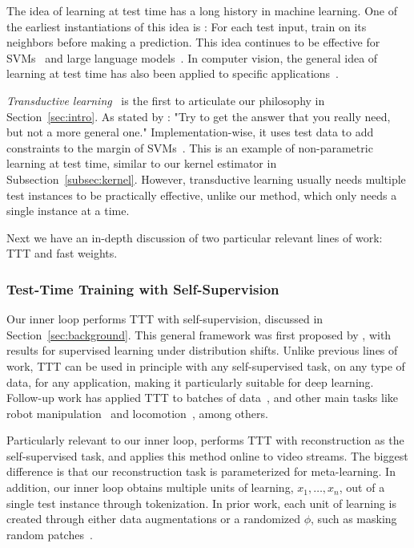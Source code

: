 \documentclass{article}
\begin{document}
The idea of learning at test time has a long history in machine learning.
One of the earliest instantiations of this idea is \cite{bottou1992local}:
For each test input, train on its neighbors before making a prediction.
This idea continues to be effective for SVMs~\citep{zhang2006svm} and large language models~\citep{hardt2023test}.
In computer vision, the general idea of learning at test time has also been applied to specific applications~\citep{jain2011online, shocher2018zero, mullapudi2018online, luo2020consistent, nitzan2022mystyle}.

\emph{Transductive learning}~\citep{Gammerman98learningby} is the first to articulate our philosophy in Section~\ref{sec:intro}.
As stated by \cite{vapnik2013nature}:
"Try to get the answer that you really need, but not a more general one."
Implementation-wise, it uses test data to add constraints to the margin of SVMs~\citep{joachims2002learning, collobert2006large}.
This is an example of non-parametric learning at test time, similar to our kernel estimator in Subsection~\ref{subsec:kernel}. 
However, transductive learning usually needs multiple test instances to be practically effective, unlike our method, which only needs a single instance at a time.

Next we have an in-depth discussion of two particular relevant lines of work: TTT and fast weights.

\subsubsection{Test-Time Training with Self-Supervision}

Our inner loop performs TTT with self-supervision, discussed in Section~\ref{sec:background}. 
This general framework was first proposed by \cite{sun2020test}, with results for supervised learning under distribution shifts.
Unlike previous lines of work, TTT can be used in principle with any self-supervised task, on any type of data, for any application, making it particularly suitable for deep learning.
Follow-up work has applied TTT to 
batches of data~\citep{wang2020tent, liu2021ttt++}, and other main tasks like
robot manipulation~\citep{hansen2020self} and locomotion~\citep{sun2021online},
among others.

Particularly relevant to our inner loop, \cite{ttt-mae} performs TTT with reconstruction as the self-supervised task, and \cite{wang2023test} applies this method online to video streams.
The biggest difference is that our reconstruction task is parameterized for meta-learning.
In addition, our inner loop obtains multiple units of learning, $x_1,\dots,x_n$, out of a single test instance through tokenization. 
In prior work, each unit of learning is created through either data augmentations or a randomized $\phi$, such as masking random patches~\citep{mae}.
\end{document}
